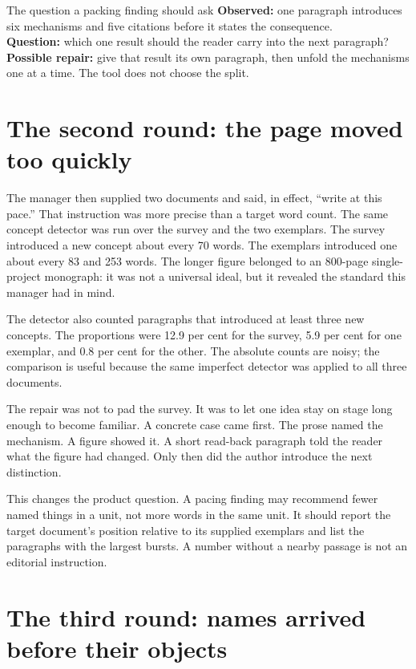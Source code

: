 \begin{cardexample}{The question a packing finding should ask}
\textbf{Observed:} one paragraph introduces six mechanisms and five citations
before it states the consequence.\\
\textbf{Question:} which one result should the reader carry into the next
paragraph?\\
\textbf{Possible repair:} give that result its own paragraph, then unfold the
mechanisms one at a time. The tool does not choose the split.
\end{cardexample}

\section{The second round: the page moved too quickly}
\label{sec:hpo-pacing}

The manager then supplied two documents and said, in effect, ``write at this
pace.'' That instruction was more precise than a target word count. The same
concept detector was run over the survey and the two exemplars. The survey
introduced a new concept about every 70 words. The exemplars introduced one
about every 83 and 253 words. The longer figure belonged to an 800-page
single-project monograph: it was not a universal ideal, but it revealed the
standard this manager had in mind.

The detector also counted paragraphs that introduced at least three new
concepts. The proportions were 12.9 per cent for the survey, 5.9 per cent for
one exemplar, and 0.8 per cent for the other. The absolute counts are noisy;
the comparison is useful because the same imperfect detector was applied to
all three documents.

The repair was not to pad the survey. It was to let one idea stay on stage
long enough to become familiar. A concrete case came first. The prose named
the mechanism. A figure showed it. A short read-back paragraph told the reader
what the figure had changed. Only then did the author introduce the next
distinction.

This changes the product question. A pacing finding may recommend fewer named
things in a unit, not more words in the same unit. It should report the target
document's position relative to its supplied exemplars and list the paragraphs
with the largest bursts. A number without a nearby passage is not an editorial
instruction.

\hvFigureDensityLadder

\section{The third round: names arrived before their objects}
\label{sec:hpo-ordering}

